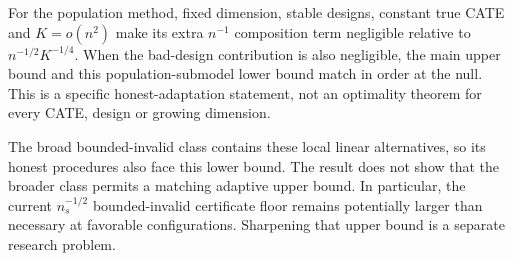 For the population method, fixed dimension, stable designs, constant true
CATE and $K=o(n^2)$ make its extra $n^{-1}$ composition term negligible
relative to $n^{-1/2}K^{-1/4}$. When the bad-design contribution is also
negligible, the main upper bound and this population-submodel lower bound
match in order at the null. This is a specific honest-adaptation statement,
not an optimality theorem for every CATE, design or growing dimension.

The broad bounded-invalid class contains these local linear alternatives,
so its honest procedures also face this lower bound. The result does not
show that the broader class permits a matching adaptive upper bound. In
particular, the current $n_s^{-1/2}$ bounded-invalid certificate floor remains
potentially larger than necessary at favorable configurations. Sharpening
that upper bound is a separate research problem.
